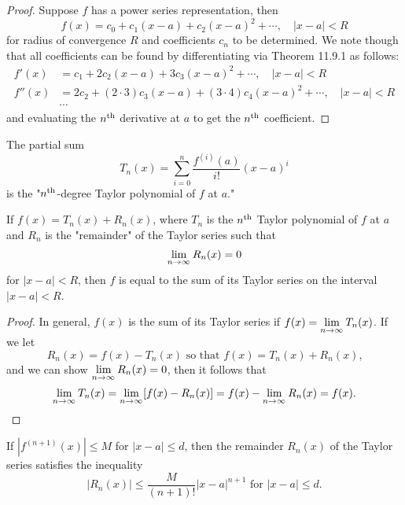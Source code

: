 \documentclass[a4paper,8pt]{article}
\begin{document}
\begin{outline}
    \begin{proof}
      Suppose \(f\) has a power series representation, then
      \[ f(x) = c_0 + c_1(x-a) + c_2(x-a)^2 + \cdots,\quad |x-a| < R \]
      for radius of convergence \(R\) and coefficients \(c_n\) to be determined.
      We note though that all coefficients can be found by differentiating via Theorem 11.9.1 as follows:
      \begin{align*}
        f'(x) &= c_1 + 2c_2(x-a) + 3c_3(x-a)^2 + \cdots,\quad |x-a| < R \\
        f''(x) &= 2c_2 + (2\cdot 3)c_3(x-a) + (3\cdot 4)c_4(x-a)^2 + \cdots,\quad |x-a| < R \\
              &\cdots
      \end{align*}
      and evaluating the \(n\textsuperscript{th}\) derivative at \(a\) to get the \(n\textsuperscript{th}\) coefficient.
    \end{proof}

    The partial sum \[T_n(x) = \sum_{i=0}^{n}\frac{f^{(i)}(a)}{i!}(x-a)^i\] is the "\(n\textsuperscript{th}\)-degree Taylor polynomial of \(f\) at \(a\)."

    If \(f(x) = T_n(x) + R_n(x)\), where \(T_n\) is the \(n\textsuperscript{th}\) Taylor polynomial of \(f\) at \(a\) and \(R_n\) is the "remainder"
    of the Taylor series such that \[\lim\limits_{n\rightarrow \infty^{}}R_n(x) = 0\] for \(|x-a| < R\), then \(f\) is equal to the sum of its Taylor series on the
    interval \(|x-a| < R\).

    \begin{proof}
      In general, \(f(x)\) is the sum of its Taylor series if \(f(x) = \lim\limits_{n\rightarrow \infty^{}}T_n(x)\). If we let
      \[ R_n(x) = f(x) - T_n(x)\text{ so that }f(x) = T_n(x) + R_n(x)\text{,} \] and we can show \(\lim\limits_{n\rightarrow \infty^{}} R_n(x) = 0\),
      then it follows that \[ \lim\limits_{n\rightarrow \infty^{}}T_n(x) = \lim\limits_{n\rightarrow \infty^{}}[f(x) - R_n(x)] = f(x) - \lim\limits_{n\rightarrow \infty^{}}R_n(x) = f(x)\text{.} \]
    \end{proof}

  \pagebreak
    If \(|f^{(n+1)}(x)| \leq M\) for \(|x-a| \leq d\), then the remainder \(R_n(x)\) of the Taylor series satisfies the inequality
    \[ |R_n(x)| \leq \frac{M}{(n+1)!}|x-a|^{n+1}\text{ for } |x-a| \leq d\text{.} \]

\end{outline}
\end{document}
